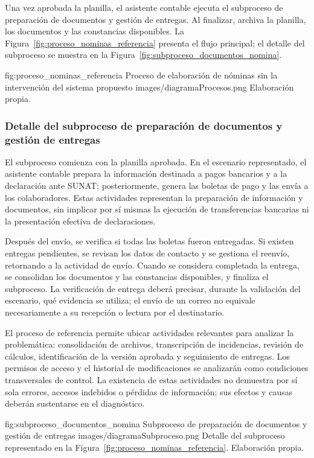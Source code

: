 Una vez aprobada la planilla, el asistente contable ejecuta el subproceso de preparación de documentos y gestión de entregas. 
Al finalizar, archiva la planilla, los documentos y las constancias disponibles. 
La Figura~\ref{fig:proceso_nominas_referencia} presenta el flujo principal; el detalle del subproceso se muestra en la Figura~\ref{fig:subproceso_documentos_nomina}.

\vspace{0.3cm}

\figuraEnTexto
    {fig:proceso_nominas_referencia}
    {Proceso de elaboración de nóminas sin la intervención del sistema propuesto}
    {images/diagramaProcesos.png}
    {Elaboración propia.}

\vspace{0.4cm}

\subsubsection{Detalle del subproceso de preparación de documentos y gestión de entregas}

El subproceso comienza con la planilla aprobada. En el escenario representado, el asistente contable prepara la información destinada a pagos bancarios y a la declaración ante SUNAT; 
posteriormente, genera las boletas de pago y las envía a los colaboradores. Estas actividades representan la preparación de información y documentos, 
sin implicar por sí mismas la ejecución de transferencias bancarias ni la presentación efectiva de declaraciones.

Después del envío, se verifica si todas las boletas fueron entregadas. 
Si existen entregas pendientes, se revisan los datos de contacto y se gestiona el reenvío, retornando a la actividad de envío. 
Cuando se considera completada la entrega, se consolidan los documentos y las constancias disponibles, y finaliza el subproceso. 
La verificación de entrega deberá precisar, durante la validación del escenario, qué evidencia se utiliza; 
el envío de un correo no equivale necesariamente a su recepción o lectura por el destinatario.

El proceso de referencia permite ubicar actividades relevantes para analizar la problemática: consolidación de archivos, 
transcripción de incidencias, revisión de cálculos, identificación de la versión aprobada y seguimiento de entregas. 
Los permisos de acceso y el historial de modificaciones se analizarán como condiciones transversales de control. 
La existencia de estas actividades no demuestra por sí sola errores, accesos indebidos o pérdidas de información; sus efectos y causas deberán sustentarse en el diagnóstico.

\vspace{0.3cm}

\figuraEnTexto
    {fig:subproceso_documentos_nomina}
    {Subproceso de preparación de documentos y gestión de entregas}
    {images/diagramaSubproceso.png}
    {Detalle del subproceso representado en la
    Figura~\ref{fig:proceso_nominas_referencia}.
    Elaboración propia.}